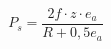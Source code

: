 \documentclass[12pt]{article}
\begin{document}
\begin{displaymath}
P_s = \frac{2f \cdot z \cdot e_a} {R + 0,5e_a}
\end{displaymath}
\end{document}
